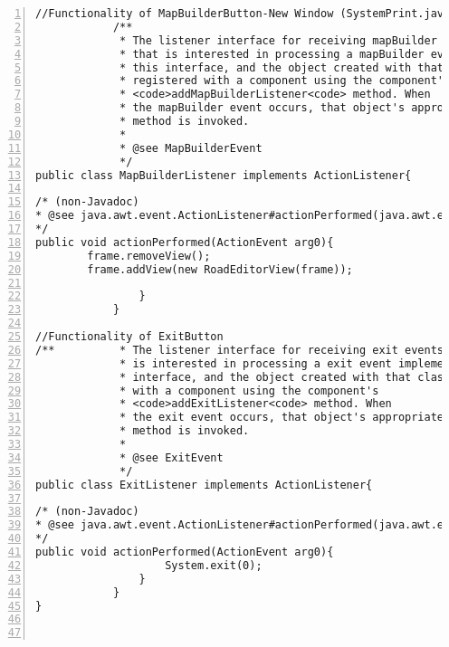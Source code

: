 \begin{lstlisting}[numbers=left, numberstyle=\small, numbersep=8pt,  framexleftmargin=1pt, framexrightmargin=10pt ]
			//Functionality of MapBuilderButton-New Window (SystemPrint.java)
			/**
			 * The listener interface for receiving mapBuilder events. The class
			 * that is interested in processing a mapBuilder event implements
			 * this interface, and the object created with that class is
			 * registered with a component using the component's
			 * <code>addMapBuilderListener<code> method. When
			 * the mapBuilder event occurs, that object's appropriate
			 * method is invoked.
			 *
			 * @see MapBuilderEvent
			 */
public class MapBuilderListener implements ActionListener{
				
/* (non-Javadoc)
* @see java.awt.event.ActionListener#actionPerformed(java.awt.event.ActionEvent)
*/
public void actionPerformed(ActionEvent arg0){
		frame.removeView();
		frame.addView(new RoadEditorView(frame));
					
				}
			}
			
//Functionality of ExitButton
/**			 * The listener interface for receiving exit events. The class that
			 * is interested in processing a exit event implements this
			 * interface, and the object created with that class is registered
			 * with a component using the component's
			 * <code>addExitListener<code> method. When
			 * the exit event occurs, that object's appropriate
			 * method is invoked.
			 *
			 * @see ExitEvent
			 */
public class ExitListener implements ActionListener{
				
/* (non-Javadoc)
* @see java.awt.event.ActionListener#actionPerformed(java.awt.event.ActionEvent)
*/
public void actionPerformed(ActionEvent arg0){
					System.exit(0);
				}
			}
}



\end{lstlisting}
